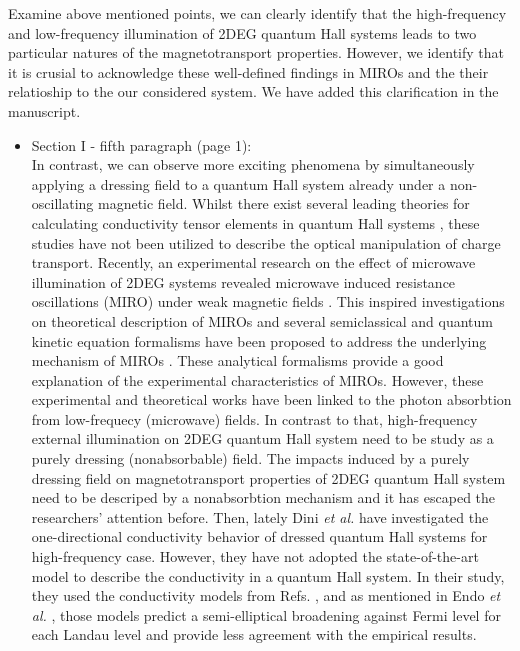 \documentclass{article}
\begin{document}
Examine above mentioned points, we can clearly identify that the high-frequency and low-frequency illumination of 2DEG quantum Hall systems leads to two particular natures of the magnetotransport properties. However, we identify that it is crusial to acknowledge these well-defined findings in MIROs and the their relatioship to the our considered system. We have added this clarification in the manuscript.

\begin{itemize}
  \item Section I - fifth paragraph (page 1):\\
  {\color{Maroon}
  In contrast, we can observe more exciting phenomena by simultaneously applying a dressing field to a quantum Hall system already under a non-oscillating magnetic field.
  Whilst there exist several leading theories for calculating conductivity tensor elements in quantum Hall systems \cite{ando74_1,ando82,endo09}, these studies  have not been utilized to describe the optical manipulation of charge transport. Recently, an experimental research on the effect of microwave illumination of 2DEG systems revealed microwave induced resistance oscillations (MIRO) under weak magnetic fields \cite{zudov01,mani02,zudov03,mani04}.
  This inspired investigations on theoretical description of MIROs and several semiclassical and quantum kinetic equation formalisms have been proposed to address the underlying mechanism of MIROs \cite{durst03,dmitriev03,dmitriev05,dmitriev09}. These analytical formalisms provide a good explanation of the experimental characteristics of MIROs. However, these experimental and theoretical works have been linked to the photon absorbtion from low-frequecy (microwave) fields. In contrast to that, high-frequency external illumination on 2DEG quantum Hall system need to be study as a purely dressing (nonabsorbable) field.
  The impacts induced by a purely dressing field on magnetotransport properties of 2DEG quantum Hall system need to be descriped by a nonabsorbtion mechanism and it has escaped the researchers’ attention before.
  Then, lately Dini \textit{et al.} \cite{dini16} have investigated the one-directional conductivity behavior of dressed quantum Hall systems for high-frequency case. However, they have not adopted the state-of-the-art model to describe the conductivity in a quantum Hall system. In their study, they used the conductivity models from Refs. \cite{ando74_1,ando82}, and as mentioned in Endo \textit{et al.} \cite{endo09}, those models predict a semi-elliptical broadening against Fermi level for each Landau level and provide less agreement with the empirical results.
}
\end{itemize}
\end{document}
